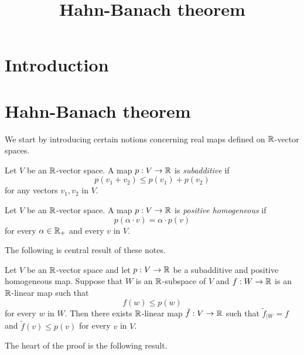 



\title{Hahn-Banach theorem}
\date{}
\maketitle

\section{Introduction}

\section{Hahn-Banach theorem}
\noindent
We start by introducing certain notions concerning real maps defined on ${\mathbb R}$-vector spaces.

\begin{definition}
Let $V$ be an ${\mathbb R}$-vector space. A map $p:V\rightarrow {\mathbb R}$ is \textit{subadditive} if 
$$p(v_1 + v_2)\leq p(v_1) + p(v_2)$$
for any vectors $v_1,v_2$ in $V$.
\end{definition}

\begin{definition}
Let $V$ be an ${\mathbb R}$-vector space. A map $p:V\rightarrow {\mathbb R}$ is \textit{positive homogeneous} if 
$$p(\alpha \cdot v) = \alpha \cdot p(v)$$
for every $\alpha \in {\mathbb R}_+$ and every $v$ in $V$.
\end{definition}
\noindent
The following is central result of these notes.

\begin{theorem}\label{theorem:hahn_banach_theorem}
Let $V$ be an ${\mathbb R}$-vector space and let $p:V\rightarrow {\mathbb R}$ be a subadditive and positive homogeneous map. Suppose that $W$ is an ${\mathbb R}$-subspace of $V$ and $f:W\rightarrow {\mathbb R}$ is an ${\mathbb R}$-linear map such that
$$f(w) \leq p(w)$$
for every $w$ in $W$. Then there exists ${\mathbb R}$-linear map $\tilde{f}:V\rightarrow {\mathbb R}$ such that $\tilde{f}_{\mid W} = f$ and $\tilde{f}(v) \leq p(v)$ for every $v$ in $V$.
\end{theorem}
\noindent
The heart of the proof is the following result.

